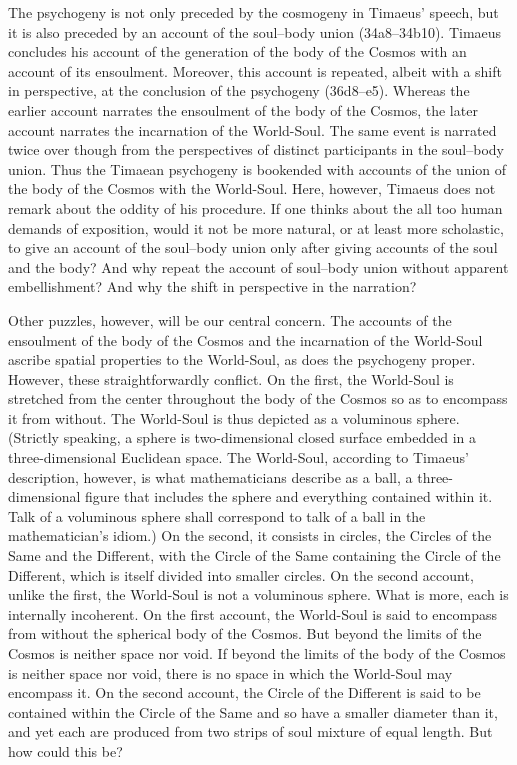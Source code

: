 The psychogeny is not only preceded by the cosmogeny in Timaeus' speech, but it is also preceded by an account of the soul--body union (34a8–34b10). Timaeus concludes his account of the generation of the body of the Cosmos with an account of its ensoulment. Moreover, this account is repeated, albeit with a shift in perspective, at the conclusion of the psychogeny (36d8--e5). Whereas the earlier account narrates the ensoulment of the body of the Cosmos, the later account narrates the incarnation of the World-Soul. The same event is narrated twice over though from the perspectives of distinct participants in the soul--body union. Thus the Timaean psychogeny is bookended with accounts of the union of the body of the Cosmos with the World-Soul. Here, however, Timaeus does not remark about the oddity of his procedure. If one thinks about the all too human demands of exposition, would it not be more natural, or at least more scholastic, to give an account of the soul--body union only after giving accounts of the soul and the body? And why repeat the account of soul--body union without apparent embellishment? And why the shift in perspective in the narration?

Other puzzles, however, will be our central concern. The accounts of the ensoulment of the body of the Cosmos and the incarnation of the World-Soul ascribe spatial properties to the World-Soul, as does the psychogeny proper. However, these straightforwardly conflict. On the first, the World-Soul is stretched from the center throughout the body of the Cosmos so as to encompass it from without. The World-Soul is thus depicted as a voluminous sphere. (Strictly speaking, a sphere is two-dimensional closed surface embedded in a three-dimensional Euclidean space. The World-Soul, according to Timaeus' description, however, is what mathematicians describe as a ball, a three-dimensional figure that includes the sphere and everything contained within it. Talk of a voluminous sphere shall correspond to talk of a ball in the mathematician's idiom.) On the second, it consists in circles, the Circles of the Same and the Different, with the Circle of the Same containing the Circle of the Different, which is itself divided into smaller circles. On the second account, unlike the first, the World-Soul is not a voluminous sphere. What is more, each is internally incoherent. On the first account, the World-Soul is said to encompass from without the spherical body of the Cosmos. But beyond the limits of the Cosmos is neither space nor void. If beyond the limits of the body of the Cosmos is neither space nor void, there is no space in which the World-Soul may encompass it. On the second account, the Circle of the Different is said to be contained within the Circle of the Same and so have a smaller diameter than it, and yet each are produced from two strips of soul mixture of equal length. But how could this be?

